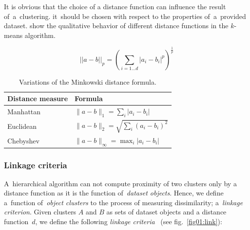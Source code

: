 It is obvious that the choice of a distance function can influence the result of~a~clustering.  it\ should be chosen with respect to the properties of~a~provided dataset. \citet{aggarwal2001surprising} show the qualitative behavior of different distance functions in the $k$-means algorithm.

\begin{equation}\label{eq01:mink}
||a-b||_p = (\sum_{i=1...d}|a_i-b_i|^p)^{\frac{1}{p}}
\end{equation}

\begin{table}[t]
	\centering
	\renewcommand{\arraystretch}{1.3} %
	\begin{tabular}{ll}
		\toprule
		Distance measure & Formula \\
		\midrule
		Manhattan & $\|a-b\|_1 = \sum_{i}|a_i-b_i|$          \\
		Euclidean & $\|a-b\|_2 = \sqrt{\sum_{i}(a_i-b_i)^2}$ \\
		Chebyshev & $\|a-b\|_\infty = \max_{i}|a_i-b_i|$  \\
		\bottomrule
	\end{tabular}
	\caption{Variations of the Minkowski distance formula.}
	\label{tab01:mink}
\end{table}

\subsubsection{Linkage criteria}

 A~hierarchical algorithm can not compute  proximity of two clusters only by a distance function as it is the function of~\emph{dataset objects}. Hence, we define a~function of~\emph{object clusters} to  the process of measuring dissimilarity; a~\emph{linkage criterion}. Given clusters $A$ and $B$ as sets of dataset objects and a distance function~$d$, we define the following \emph{linkage criteria}~\cite{yim2015hierarchical} (see fig.~\ref{fig01:link}):

